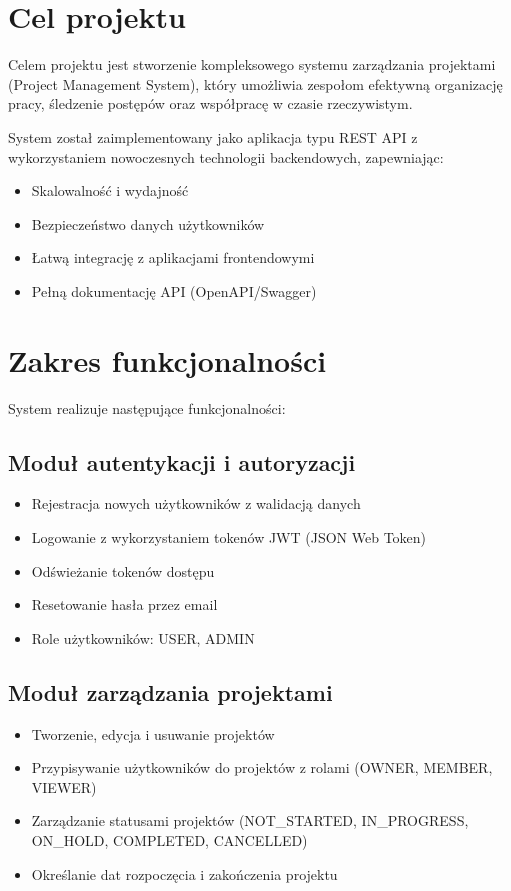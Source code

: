 \documentclass[12pt,a4paper]{report}
\begin{document}
\section{Cel projektu}

Celem projektu jest stworzenie kompleksowego systemu zarządzania projektami (Project Management System), który umożliwia zespołom efektywną organizację pracy, śledzenie postępów oraz współpracę w czasie rzeczywistym.

System został zaimplementowany jako aplikacja typu REST API z wykorzystaniem nowoczesnych technologii backendowych, zapewniając:
\begin{itemize}
    \item Skalowalność i wydajność
    \item Bezpieczeństwo danych użytkowników
    \item Łatwą integrację z aplikacjami frontendowymi
    \item Pełną dokumentację API (OpenAPI/Swagger)
\end{itemize}

\section{Zakres funkcjonalności}

System realizuje następujące funkcjonalności:

\subsection{Moduł autentykacji i autoryzacji}
\begin{itemize}
    \item Rejestracja nowych użytkowników z walidacją danych
    \item Logowanie z wykorzystaniem tokenów JWT (JSON Web Token)
    \item Odświeżanie tokenów dostępu
    \item Resetowanie hasła przez email
    \item Role użytkowników: USER, ADMIN
\end{itemize}

\subsection{Moduł zarządzania projektami}
\begin{itemize}
    \item Tworzenie, edycja i usuwanie projektów
    \item Przypisywanie użytkowników do projektów z rolami (OWNER, MEMBER, VIEWER)
    \item Zarządzanie statusami projektów (NOT\_STARTED, IN\_PROGRESS, ON\_HOLD, COMPLETED, CANCELLED)
    \item Określanie dat rozpoczęcia i zakończenia projektu
\end{itemize}
\end{document}
